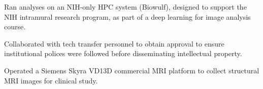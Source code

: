 \begin{cventries}
{\begin{cvitems}
        	\item {Ran analyses on an NIH-only HPC system (Biowulf), designed to support the NIH intramural research program, as part of a deep learning for image analysis course.}
        	\item {Collaborated with tech transfer personnel to obtain approval to ensure institutional polices were followed before disseminating intellectual property.}
        	\item {Operated a Siemens Skyra VD13D commercial MRI platform to collect structural MRI images for clinical study.}
        \end{cvitems}
 	}


\end{cventries}
